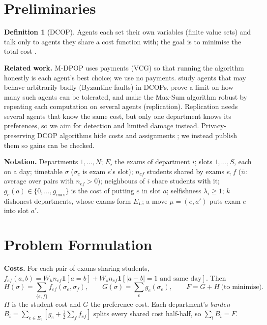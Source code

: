 \documentclass{article}
\theoremstyle{definition}
\newtheorem{definition}{Definition}
\newcommand{\1}{\mathbf{1}}
\newcommand{\gmax}{g_{\max}}
\begin{document}
\section{Preliminaries}
\label{sec:prelim}
\begin{definition}[DCOP]
Agents each set their own variables (finite value sets) and talk only to agents they share a cost function with; the goal is to minimise the total cost \citep{fioretto2018}.
\end{definition}

\textbf{Related work.} M-DPOP \citep{petcu2008mdpop} uses payments (VCG) so that running the algorithm honestly is each agent's best choice; we use no payments. \citet{noshiro2026} study agents that may behave arbitrarily badly (Byzantine faults) in DCOPs, prove a limit on how many such agents can be tolerated, and make the Max-Sum algorithm robust by repeating each computation on several agents (replication). Replication needs several agents that know the same cost, but only one department knows its preferences, so we aim for detection and limited damage instead. Privacy-preserving DCOP algorithms hide costs and assignments \citep{tassa2019,goldklang2025}; we instead publish them so gains can be checked.

\textbf{Notation.} Departments $1,\dots,N$; $E_i$ the exams of department $i$; slots $1,\dots,S$, each on a day; timetable $\sigma$ ($\sigma_e$ is exam $e$'s slot); $n_{ef}$ students shared by exams $e,f$ ($\bar n$: average over pairs with $n_{ef}>0$); neighbours of $i$ share students with it; $g_e(a)\in\{0,\dots,\gmax\}$ is the cost of putting $e$ in slot $a$; selfishness $\lambda_i\ge1$; $k$ dishonest departments, whose exams form $E_L$; a move $\mu=(e,a')$ puts exam $e$ into slot $a'$.

\section{Problem Formulation}
\label{sec:form}
\textbf{Costs.} For each pair of exams sharing students,
$f_{ef}(a,b)=W_h n_{ef}\1[a=b]+W_s n_{ef}\1[|a-b|=1 \text{ and same day}]$. Then
\begin{equation}
H(\sigma)=\textstyle\sum_{\{e,f\}}f_{ef}(\sigma_e,\sigma_f),\qquad G(\sigma)=\sum_e g_e(\sigma_e),\qquad F=G+H \ \text{(to minimise)}.
\label{eq:cost}
\end{equation}
$H$ is the student cost and $G$ the preference cost. Each department's \emph{burden} $B_i=\sum_{e\in E_i}[g_e+\frac12\sum_f f_{ef}]$ splits every shared cost half-half, so $\sum_iB_i=F$.
\end{document}
